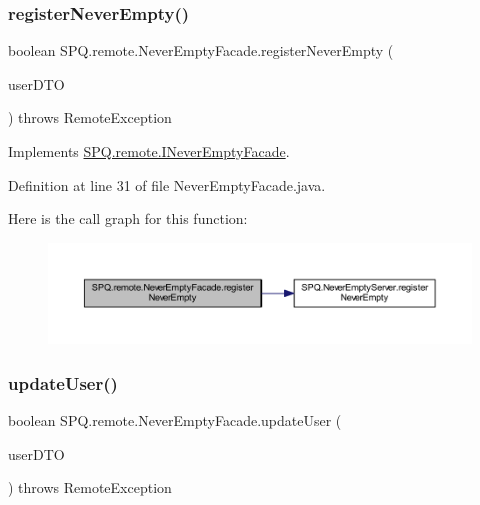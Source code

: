 \subsubsection{\texorpdfstring{register\+Never\+Empty()}{registerNeverEmpty()}}
{\footnotesize\ttfamily boolean S\+P\+Q.\+remote.\+Never\+Empty\+Facade.\+register\+Never\+Empty (\begin{DoxyParamCaption}\item[{\mbox{\hyperlink{class_s_p_q_1_1dto_1_1_user_d_t_o}{User\+D\+TO}}}]{user\+D\+TO }\end{DoxyParamCaption}) throws Remote\+Exception}



Implements \mbox{\hyperlink{interface_s_p_q_1_1remote_1_1_i_never_empty_facade_a7867e1e698fea32a535a1daeda4e8d6a}{S\+P\+Q.\+remote.\+I\+Never\+Empty\+Facade}}.



Definition at line 31 of file Never\+Empty\+Facade.\+java.

Here is the call graph for this function\+:
\nopagebreak
\begin{figure}[H]
\begin{center}
\leavevmode
\includegraphics[width=350pt]{class_s_p_q_1_1remote_1_1_never_empty_facade_a52a0feff1dfb3347e55e46c3ac48fafc_cgraph}
\end{center}
\end{figure}
\mbox{\label{class_s_p_q_1_1remote_1_1_never_empty_facade_a55ad685d3c176424a7f5f18e5ebe043b}} 
\subsubsection{\texorpdfstring{update\+User()}{updateUser()}}
{\footnotesize\ttfamily boolean S\+P\+Q.\+remote.\+Never\+Empty\+Facade.\+update\+User (\begin{DoxyParamCaption}\item[{\mbox{\hyperlink{class_s_p_q_1_1dto_1_1_user_d_t_o}{User\+D\+TO}}}]{user\+D\+TO }\end{DoxyParamCaption}) throws Remote\+Exception}




